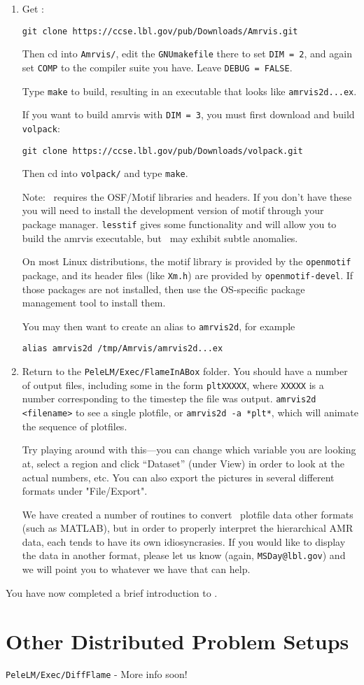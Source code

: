 \begin{enumerate}

\item Get \amrvis:
\begin{verbatim}
git clone https://ccse.lbl.gov/pub/Downloads/Amrvis.git
\end{verbatim}

Then cd into {\tt Amrvis/}, edit the {\tt GNUmakefile} there
to set {\tt DIM = 2}, and again set {\tt COMP} to the compiler
suite you have. Leave {\tt DEBUG = FALSE}.

Type {\tt make} to build, resulting in an executable that
looks like {\tt amrvis2d...ex}.

If you want to build amrvis with {\tt DIM = 3}, you must first
download and build {\tt volpack}:
\begin{verbatim}
git clone https://ccse.lbl.gov/pub/Downloads/volpack.git
\end{verbatim}

Then cd into {\tt volpack/} and type {\tt make}.

Note: \amrvis\ requires the OSF/Motif libraries and headers. If you don't have these 
you will need to install the development version of motif through your package manager. 
{\tt lesstif} gives some functionality and will allow you to build the amrvis executable, 
but \amrvis\ may exhibit subtle anomalies.

On most Linux distributions, the motif library is provided by the
{\tt openmotif} package, and its header files (like {\tt Xm.h}) are provided
by {\tt openmotif-devel}. If those packages are not installed, then use the
OS-specific package management tool to install them. 

You may then want to create an alias to {\tt amrvis2d}, for example
\begin{verbatim}
alias amrvis2d /tmp/Amrvis/amrvis2d...ex
\end{verbatim}

\item Return to the {\tt PeleLM/Exec/FlameInABox} folder.  You should
  have a number of output files, including some in the form {\tt *pltXXXXX},
  where {\tt XXXXX} is a number corresponding to the timestep the file
  was output.  {\tt amrvis2d <filename>} to see a single plotfile, 
   or {\tt amrvis2d -a *plt*}, which will animate the sequence of plotfiles.

  Try playing
  around with this---you can change which variable you are
  looking at, select a region and click ``Dataset'' (under View)
  in order to look at the actual numbers, etc. You can also export the
  pictures in several different formats under "File/Export".

We have created a number of routines to convert \amrex\ plotfile data
other formats (such as MATLAB), but in order to properly interpret 
the hierarchical AMR data, each tends to have its own idiosyncrasies.
If you would like to display the data in another format, please let us know
(again, {\tt MSDay@lbl.gov}) and we will point you to whatever we have
that can help.

\end{enumerate}

You have now completed a brief introduction to \pelelm. 


\section{Other Distributed Problem Setups}
{\tt PeleLM/Exec/DiffFlame} - More info soon!
